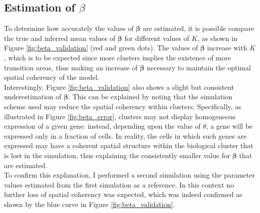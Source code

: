 	\subsection{Estimation of $\beta$}\label{subsec:beta_estimation}
	To determine how accurately the values of $\boldsymbol{\beta}$ are estimated, it is possible compare the true and inferred mean values of $\boldsymbol{\beta}$ for different values of $K$, as shown in Figure \ref{fig:beta_validation} (red and green dots). The values of $\boldsymbol{\beta}$ increase with $K$, which is to be expected since more clusters implies the existence of more transition areas, thus making an increase of $\boldsymbol{\beta}$ necessary to maintain the optimal spatial coherency of the model.\\
	
	Interestingly, Figure \ref{fig:beta_validation} also shows a slight but consistent underestimation of $\boldsymbol{\beta}$. This can be explained by noting that the simulation scheme used may reduce the spatial coherency within clusters. Specifically, as illustrated in Figure \ref{fig:beta_error}, clusters may not display homogeneous expression of a given gene: instead, depending upon the value of $\theta$, a gene will be expressed only in a fraction of cells. In reality, the cells in which such genes are expressed may have a coherent spatial structure within the biological cluster that is lost in the simulation, thus explaining the consistently smaller value for $\boldsymbol{\beta}$ that are estimated.\\
	
	 To confirm this explanation, I performed a second simulation using the parameter values estimated from the first simulation as a reference. In this context no further loss of spatial coherency was expected, which was indeed confirmed as shown by the blue curve in Figure \ref{fig:beta_validation}.\\
	
